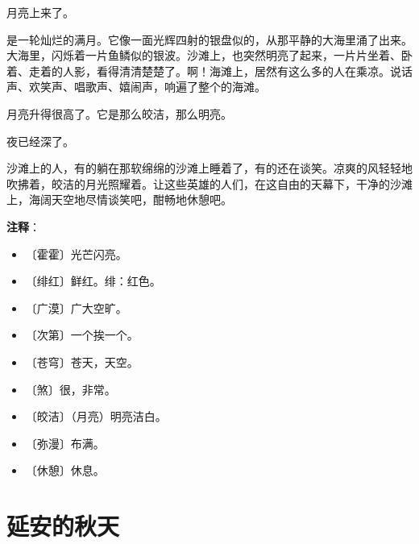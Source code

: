 \documentclass[12pt,UTF-8,openany]{ctexbook}
\begin{document}
\begin{Large}
    月亮上来了。
    
    是一轮灿烂的满月。它像一面光辉四射的银盘似的，从那平静的大海里涌了出来。大海里，闪烁着一片鱼鳞似的银波。沙滩上，也突然明亮了起来，一片片坐着、卧着、走着的人影，看得清清楚楚了。啊！海滩上，居然有这么多的人在乘凉。说话声、欢笑声、唱歌声、嬉闹声，响遍了整个的海滩。
    
    月亮升得很高了。它是那么皎洁，那么明亮。
    
    夜已经深了。
    
    沙滩上的人，有的躺在那软绵绵的沙滩上睡着了，有的还在谈笑。凉爽的风轻轻地吹拂着，皎洁的月光照耀着。让这些英雄的人们，在这自由的天幕下，干净的沙滩上，海阔天空地尽情谈笑吧，酣畅地休憩吧。
    
\end{Large}


\newpage

\textbf{注释}：

\vspace{-1em}

\begin{itemize}
    \setlength\itemsep{-0.2em}
    \item 〔霍霍〕光芒闪亮。
    \item 〔绯红〕鲜红。绯：红色。
    \item 〔广漠〕广大空旷。
    \item 〔次第〕一个挨一个。
    \item 〔苍穹〕苍天，天空。
    \item 〔煞〕很，非常。
    \item 〔皎洁〕（月亮）明亮洁白。
    \item 〔弥漫〕布满。
    \item 〔休憩〕休息。
\end{itemize}

\chapter{延安的秋天}
\end{document}

